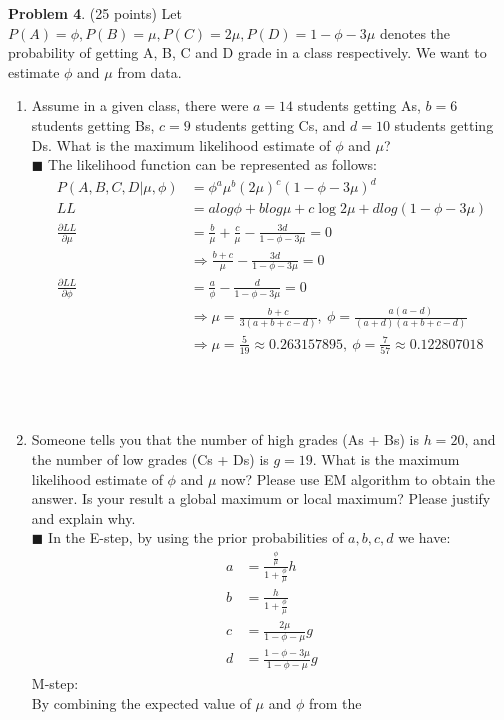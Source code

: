 \documentclass{article}
\newcommand{\solution}[1]{~\\ $\blacksquare$ \sffamily\upshape\selectfont #1
\normalfont ~\\~ }
\begin{document}
\textbf{Problem 4}. (25 points) Let $P(A) = \phi, P (B) = \mu, P (C) =
2\mu, P (D) = 1 - \phi - 3\mu$ denotes the probability of getting A,
B, C and D grade in a class respectively. We want to estimate $\phi$ and $\mu$
from data. 
\begin{enumerate}
\item Assume in a given class, there were $a = 14$ students getting
  As, $b = 6$ students getting Bs, $c = 9$ students getting Cs, and $d
  = 10$ students getting Ds. What is the maximum likelihood estimate of
  $\phi$ and $\mu$?
\solution{
  The likelihood function can be represented as follows: 
  \begin{align*}
    P(A,B,C,D|\mu, \phi) & = \phi^a\mu^b(2\mu)^c(1-\phi-3\mu)^d \\
    LL & = alog\phi + blog\mu + c\log2\mu + dlog(1-\phi-3\mu) \\
    \frac{\partial LL}{\partial \mu} &= \frac{b}{\mu} + \frac{c}{\mu}
    - \frac{3d}{1-\phi-3\mu} = 0 \\
    &\Rightarrow \frac{b+c}{\mu} - \frac{3d}{1-\phi-3\mu} = 0 \\ 
    \frac{\partial LL}{\partial \phi} &= \frac{a}{\phi} -
    \frac{d}{1-\phi-3\mu} = 0 \\ 
    &\Rightarrow \mu = \frac{b+c}{3(a+b+c-d)},~\phi = 
    \frac{a(a-d)}{(a+d)(a+b+c-d)} \\ 
    &\Rightarrow \mu = \frac{5}{19}\approx 0.263157895, ~ \phi =
    \frac{7}{57} \approx 0.122807018 \\
  \end{align*}
}
\item Someone tells you that the number of high grades (As + Bs) is $h
= 20$, and the number of low grades (Cs + Ds) is $g = 19$. What is the
maximum likelihood estimate of $\phi$ and $\mu$ now? Please use EM
algorithm to obtain the answer. Is your result a global maximum or
local maximum? Please justify and explain why.
\solution{
  In the E-step, by using the prior probabilities of $a, b, c, d$ we
  have: 
  \begin{align*}
    a & = \frac{\frac{\phi}{\mu}}{1+\frac{\phi}{\mu}}h \\ 
    b & = \frac{h}{1+\frac{\phi}{\mu}} \\ 
    c & = \frac{2\mu}{1-\phi-\mu}g \\ 
    d & = \frac{1-\phi-3\mu}{1-\phi-\mu} g
  \end{align*}
  M-step: \\
  By combining the expected value of $\mu$ and $\phi$ from the
}
\end{enumerate}
\end{document}
